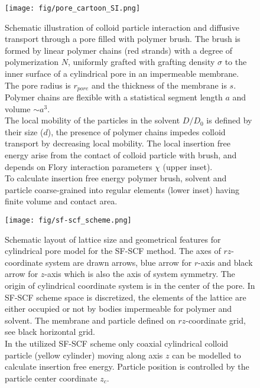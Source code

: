 \documentclass[12pt, a4paper]{article}
\begin{document}
\begin{figure}
    \centering
    \texttt{[image: fig/pore\_cartoon\_SI.png]}
    \caption{
        Schematic illustration of colloid particle interaction and diffusive transport through a pore filled with polymer brush. 
        The brush is formed by linear polymer chains (red strands) with a degree of polymerization $N$, uniformly grafted with grafting density $\sigma$  
        to the inner surface of a cylindrical pore in an impermeable membrane. The pore radius is $r_{pore}$ and the thickness of the membrane is $s$.
        Polymer chains are flexible with a statistical segment length $a$ and volume $\sim a^3$.
        \\
        The local mobility of the particles in the solvent $D/D_{0}$ is defined by their size ($d$), the presence of polymer chains impedes colloid transport by decreasing local mobility.
        The local insertion free energy arise from the contact of colloid particle with brush, and depends on Flory interaction parameters $\chi$ (upper inset). 
        \\
        To calculate insertion free energy polymer brush, solvent and particle coarse-grained into regular elements (lower inset) having finite volume and contact area.
        }
    \label{fig:colloid_transport}
\end{figure}

\begin{figure}
    \centering
    \texttt{[image: fig/sf-scf\_scheme.png]}
    \caption{
        Schematic layout of lattice size and geometrical features for cylindrical pore model for the SF-SCF method.
        The axes of $rz$-coordinate system are drawn arrows, blue arrow for $r$-axis and black arrow for $z$-axis which is also the axis of system symmetry.
        The origin of cylindrical coordinate system is in the center of the pore.
        In SF-SCF scheme space is discretized, the elements of the lattice are either occupied or not by bodies impermeable for polymer and solvent.
        The membrane and particle defined on $rz$-coordinate grid, see black horizontal grid.
        \\
        In the utilized SF-SCF scheme only coaxial cylindrical colloid particle (yellow cylinder) moving along axis $z$ can be modelled to calculate insertion free energy. 
        Particle position is controlled by the particle center coordinate $z_c$.
        }
    \label{fig:particle_insertion_0}
\end{figure}
\end{document}
